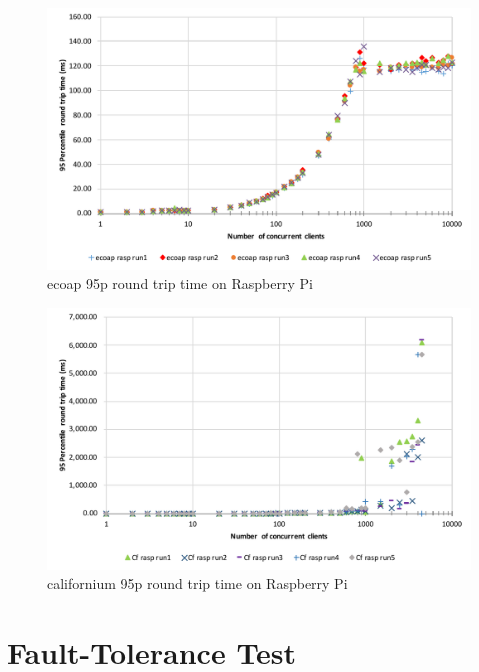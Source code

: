 \begin{figure}[!htbp]
\centering
\includegraphics[scale = 0.8]{ecoap_95p_round_trip_time_rasp}
\caption{ecoap 95p round trip time on Raspberry Pi}
\label{fig:ecoap_95p_round_trip_time_rasp}
\end{figure}

\begin{figure}[!htbp]
\centering
\includegraphics[scale = 0.8]{californium_95p_round_trip_time_rasp}
\caption{californium 95p round trip time on Raspberry Pi}
\label{fig:californium_95p_round_trip_time_rasp}
\end{figure}



\section{Fault-Tolerance Test}

